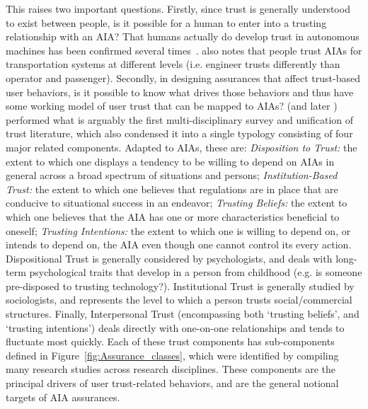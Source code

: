 This raises two important questions. Firstly, since trust is generally understood to exist between people, is it possible for a human to enter into a trusting relationship with an AIA? 
That humans actually do develop trust in autonomous machines has been confirmed several times~\cite{Muir1996-gt,Mcknight2011-gv,Riley1996-qm,Bainbridge2011-pl,Salem2015-md,Desai2012-rc, Freedy2007-sg, Kaniarasu2013-ho, Wang2016-id}. 
\citet{Lacher2014-yc} also notes that people trust AIAs for transportation systems at different levels (i.e. engineer trusts differently than operator and passenger). 
Secondly, in designing assurances that affect trust-based user behaviors, is it possible to know what drives those behaviors and thus have some working model of user trust that can be mapped to AIAs? 
\citet{McKnight1998-ty} (and later \cite{McKnight2001-fa}) performed what is arguably the first multi-disciplinary survey and unification of trust literature, which also condensed it into a single typology consisting of four major related components. 
Adapted to AIAs, these are: \textit{Disposition to Trust:} the extent to which one displays a tendency to be willing to depend on AIAs in general across a broad spectrum of situations and persons; \textit{Institution-Based Trust:} the extent to which one believes that regulations are in place that are conducive to situational success in an endeavor; \textit{Trusting Beliefs:} the extent to which one believes that the AIA has one or more characteristics beneficial to oneself; \textit{Trusting Intentions:} the extent to which one is willing to depend on, or intends to depend on, the AIA even though one cannot control its every action. 
Dispositional Trust is generally considered by psychologists, and deals with long-term psychological traits that develop in a person from childhood (e.g. is someone pre-disposed to trusting technology?).  
Institutional Trust 
is generally studied by sociologists, and represents the level to which a person trusts social/commercial structures. 
Finally, Interpersonal Trust (encompassing both `trusting beliefs', and `trusting intentions') deals directly with one-on-one relationships and tends to fluctuate most quickly. 
Each of these trust components has sub-components defined in Figure~\ref{fig:Assurance_classes}, which were identified by compiling many research studies across research disciplines. 
These components are the principal drivers of user trust-related behaviors, and are the general notional targets of AIA assurances.

